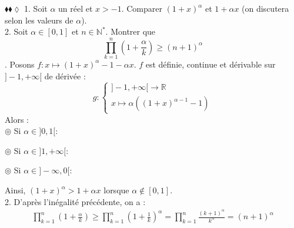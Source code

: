 \documentclass[11pt]{article}
\begin{document}
\begin{exercice}{$\blacklozenge\blacklozenge\lozenge$}{}
    1. Soit $\alpha$ un réel et $x>-1$. Comparer $(1+x)^\alpha$ et $1+\alpha x$ (on discutera selon les valeurs de $\alpha$).\\
    2. Soit $\alpha\in[0,1]$ et $n\in\mathbb{N}^*$. Montrer que
    \begin{equation*}
        \prod_{k=1}^n{\left(1+\frac{\alpha}{k}\right)}\geq(n+1)^\alpha
    \end{equation*}
    . Posons $f:x\mapsto(1+x)^\alpha-1-\alpha x$. $f$ est définie, continue et dérivable sur $]-1,+\infty[$ de dérivée :
    \begin{equation*}
        g:\begin{cases}]-1,+\infty[\rightarrow\mathbb{R}\\x\mapsto\alpha((1+x)^{\alpha-1}-1)\end{cases}
    \end{equation*}
    Alors :\\
    $\circledcirc$ Si $\alpha\in]0,1[$:
    \begin{center}
    \end{center}
    $\circledcirc$ Si $\alpha\in]1,+\infty[$:
    \begin{center}
    \end{center}
    $\circledcirc$ Si $\alpha\in]-\infty,0[$:
    \begin{center}
    \end{center}
    Ainsi, $(1+x)^\alpha > 1+\alpha x$ lorsque $\alpha\notin[0,1]$.\\[0.25cm]
    2. D'après l'inégalité précédente, on a :
    \begin{align*}
        \prod^n_{k=1}{\left(1+\frac{\alpha}{k}\right)}\geq\prod^n_{k=1}{\left(1+\frac{1}{k}\right)^\alpha}=\prod^n_{k=1}{\frac{(k+1)^\alpha}{k^\alpha}}=(n+1)^\alpha
    \end{align*}
\end{exercice}
\end{document}
